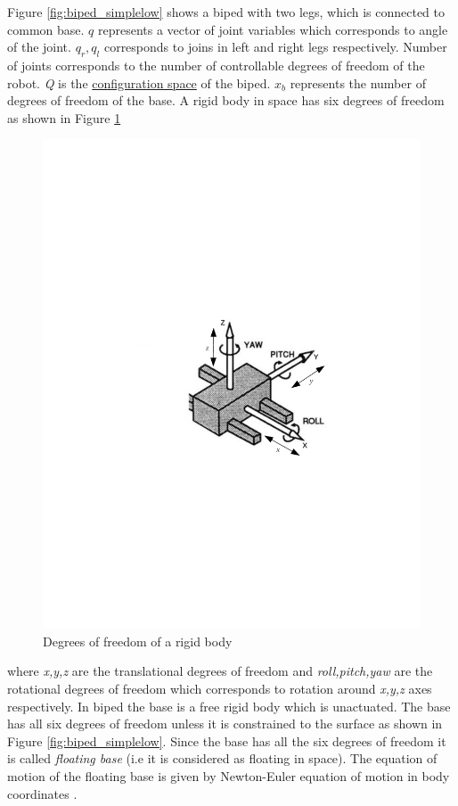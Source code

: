 Figure \ref{fig:biped_simplelow} shows a biped with two legs, which is connected to common base. $q$ represents a vector of joint variables which corresponds to angle of the joint. $q_r,q_l$ corresponds to joins in left and right legs respectively. Number of joints corresponds to the number of controllable degrees of freedom of the robot. \emph{Q} is the \underline{configuration space} of the biped. $x_b$ represents the number of degrees of freedom of the base. A rigid body in space has six degrees of freedom as shown in Figure \ref{fig:rbody} 
\begin{figure}[!htb]
\begin{center}
\includegraphics[trim= 10mm 100mm 10mm 120mm,scale=0.75]{Bilder/rbody_dof.pdf}
\caption[Degrees of freedom of a rigid body]{Degrees of freedom of a rigid body \footnotemark[1]}
\label{fig:rbody}
\end{center}
\end{figure}
where \emph{x,y,z} are the translational degrees of freedom and \emph{roll,pitch,yaw} are the rotational degrees of freedom which corresponds to rotation around \emph{x,y,z} axes respectively. In biped the base is a free rigid body which is unactuated. The base has all six degrees of freedom unless it is constrained to the surface as shown in Figure \ref{fig:biped_simplelow}. Since the base has all the six degrees of freedom it is called \emph{floating base} (i.e it is considered as floating in space). The equation of motion of the floating base is given by Newton-Euler equation of motion in body coordinates \citet[chapter 4]{mur94}.

